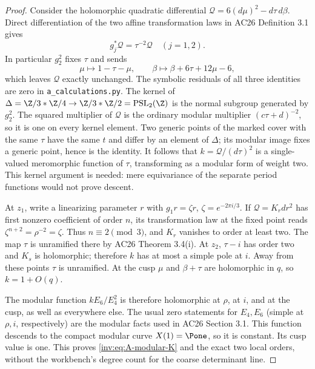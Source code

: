 \begin{proof}
Consider the holomorphic quadratic differential
$\mathscr Q=6(d\mu)^2-d\tau\,d\beta$.  Direct differentiation of
the two affine transformation laws in AC26 Definition 3.1 gives
\[
g_j^*\mathscr Q=\tau^{-2}\mathscr Q\quad(j=1,2).
\]
In particular $g_2^2$ fixes $\tau$ and sends
\[
\mu\longmapsto1-\tau-\mu,\qquad
\beta\longmapsto\beta+6\tau+12\mu-6,
\]
which leaves $\mathscr Q$ exactly unchanged.  The symbolic residuals
of all three identities are zero in \texttt{a\_calculations.py}.
The kernel of
$\Delta=\Z/3*\Z/4\to\Z/3*\Z/2=\operatorname{PSL}_2(\Z)$
is the normal subgroup generated by $g_2^2$.  The squared multiplier
of $\mathscr Q$ is the ordinary modular multiplier
$(c\tau+d)^{-2}$, so it is one on every kernel element.  Two generic
points of the marked cover with the same $\tau$ have the same $t$
and differ by an element of $\Delta$; its modular image fixes a
generic point, hence is the identity.  It follows that
$k=\mathscr Q/(d\tau)^2$ is a single-valued meromorphic function of
$\tau$, transforming as a modular form of weight two.  This kernel
argument is needed: mere equivariance of the separate period functions
would not prove descent.

At $z_1$, write a linearizing parameter $r$ with
$g_1r=\zeta r$, $\zeta=e^{-2\pi i/3}$.  If $\mathscr Q=K_rdr^2$
has first nonzero coefficient of order $n$, its transformation law
at the fixed point reads $\zeta^{n+2}=\rho^{-2}=\zeta$.
Thus $n\equiv2\pmod3$, and $K_r$ vanishes to order at least two.
The map $\tau$ is unramified there by AC26 Theorem 3.4(i).  At
$z_2$, $\tau-i$ has order two and $K_s$ is holomorphic; therefore
$k$ has at most a simple pole at $i$.  Away from these points
$\tau$ is unramified.  At the cusp $\mu$ and $\beta+\tau$ are
holomorphic in $q$, so $k=1+O(q)$.

The modular function $k E_6/E_4^2$ is therefore holomorphic at
$\rho$, at $i$, and at the cusp, as well as everywhere else.
The usual zero statements for $E_4,E_6$ (simple at $\rho,i$,
respectively) are the modular facts used in AC26 Section 3.1.
This function descends to the compact modular curve $X(1)=\Pone$,
so it is constant.  Its cusp value is one.  This proves
\eqref{inv:eq:A-modular-K} and the exact two local orders, without the
workbench's degree count for the coarse determinant line.


\end{proof}
